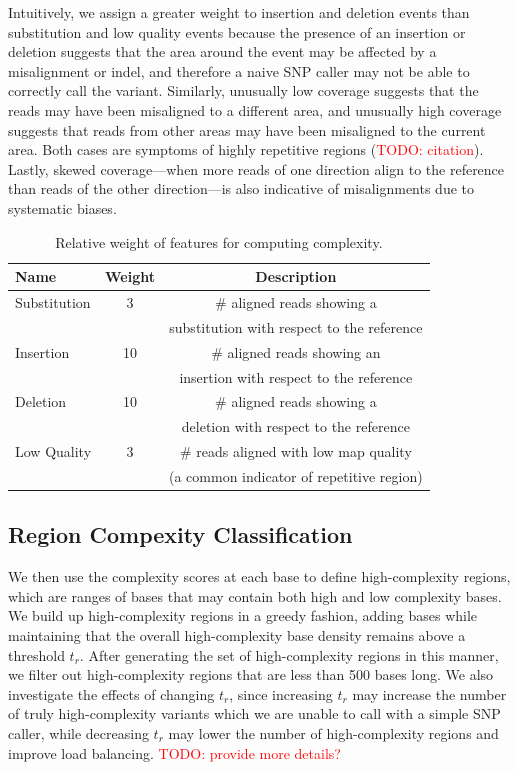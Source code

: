 \documentclass[10pt]{article}
\newcommand\TODO[1]{\textcolor{red}{TODO: #1}}
\begin{document}
Intuitively, we assign a greater weight to insertion and deletion events than substitution and low quality events because the presence of an insertion or deletion suggests that the area around the event may be affected by a misalignment or indel, and therefore a naive SNP caller may not be able to correctly call the variant.
Similarly, unusually low coverage suggests that the reads may have been misaligned to a different area, and unusually high coverage suggests that reads from other areas may have been misaligned to the current area.
Both cases are symptoms of highly repetitive regions (\TODO{citation}).
Lastly, skewed coverage---when more reads of one direction align to the reference than reads of the other direction---is also indicative of misalignments due to systematic biases.
\begin{table}[h!]
\tiny
  \centering
	\begin{tabular}{|l|c|c|}
    \hline Name & Weight & Description \\\hline
    Substitution & 3 & $\#$ aligned reads showing a \\ && substitution with respect to the reference\\\hline
    Insertion & 10 & $\#$ aligned reads showing an \\ && insertion with respect to the reference\\\hline
    Deletion & 10 & $\#$ aligned reads showing a \\ && deletion with respect to the reference\\\hline
    Low Quality & 3 & $\#$ reads aligned with low map quality \\ && (a common indicator of repetitive region)\\\hline
  \end{tabular}
  \caption{Relative weight of features for computing complexity.}
  \label{complexity}
\end{table}


\subsection{Region Compexity Classification}

We then use the complexity scores at each base to define high-complexity regions, which are ranges of bases that may contain both high and low complexity bases.
We build up high-complexity regions in a greedy fashion, adding bases while maintaining that the overall high-complexity base density remains above a threshold $t_r$.
After generating the set of high-complexity regions in this manner, we filter out high-complexity regions that are less than 500 bases long.
We also investigate the effects of changing $t_r$, since increasing $t_r$ may increase the number of truly high-complexity variants which we are unable to call with a simple SNP caller, while decreasing $t_r$ may lower the number of high-complexity regions and improve load balancing.
\TODO{provide more details?}
\end{document}
